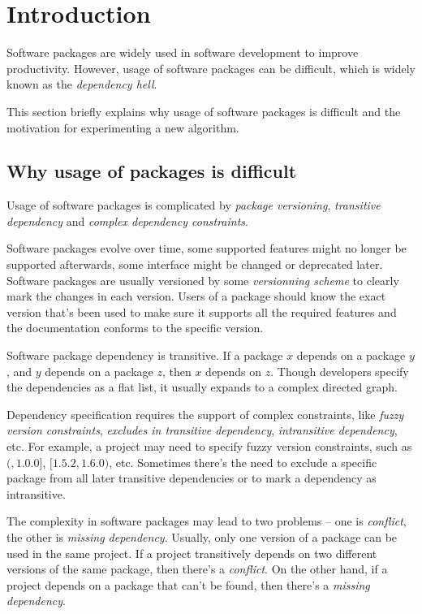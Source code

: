 \section{Introduction}

Software packages are widely used in software development to improve productivity. However, usage of software packages can be difficult, which is widely known as the \emph{dependency hell}.

This section briefly explains why usage of software packages is difficult and the motivation for experimenting a new algorithm.

\subsection{Why usage of packages is difficult}
Usage of software packages is complicated by \emph{package versioning}, \emph{transitive dependency} and \emph{complex dependency constraints}.

Software packages evolve over time, some supported features might no longer be supported afterwards, some interface might be changed or deprecated later. Software packages are usually versioned by some \emph{versionning scheme} to clearly mark the changes in each version. Users of a package should know the exact version that's been used to make sure it supports all the required features and the documentation conforms to the specific version.

Software package dependency is transitive. If a package $x$ depends on a package $y$, and $y$ depends on a package $z$, then $x$ depends on $z$. Though developers specify the dependencies as a flat list, it usually expands to a complex directed graph.

Dependency specification requires the support of complex constraints, like \emph{fuzzy version constraints}, \emph{excludes in transitive dependency}, \emph{intransitive dependency}, etc. For example, a project may need to specify fuzzy version constraints, such as $(, 1.0.0]$, $[1.5.2, 1.6.0)$, etc. Sometimes there's the need to exclude a specific package from all later transitive dependencies or to mark a dependency as intransitive.

The complexity in software packages may lead to two problems -- one is \emph{conflict}, the other is \emph{missing dependency}. Usually, only one version of a package can be used in the same project. If a project transitively depends on two different versions of the same package, then there's a \emph{conflict}. On the other hand, if a project depends on a package that can't be found, then there's a \emph{missing dependency}.

